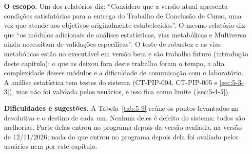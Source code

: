 \textbf{O escopo.} Um dos relatórios diz: ``Considero que a versão atual apresenta condições satisfatórias para a entrega do Trabalho de Conclusão de Curso, uma vez que atende aos objetivos originalmente estabelecidos''. O mesmo relatório diz que ``os módulos adicionais de análises estatísticas, vias metabólicas e Multiverso ainda necessitam de validações específicas''. O teste de robustez e as vias metabólicas estão no executável em versão beta e são trabalho futuro (introdução deste capítulo); o que as deixou fora deste trabalho foram o tempo, a alta complexidade desses módulos e a dificuldade de comunicação com o laboratório. A análise estatística tem testes do sistema (CT-PIP-004, CT-PIP-005 e \ref{sec:5-3-3}), mas não foi validada pelos usuários, e isso fica como limite (\ref{sec:5-4-5}).

\textbf{Dificuldades e sugestões.} A Tabela~\ref{tab:5-9} reúne os pontos levantados na devolutiva e o destino de cada um. Nenhum deles é defeito do sistema; todos são melhorias. Parte delas entrou no programa depois da versão avaliada, na versão de 12/11/2026; nada do que entrou no programa depois dela foi avaliado pelos usuários nem por este capítulo.

